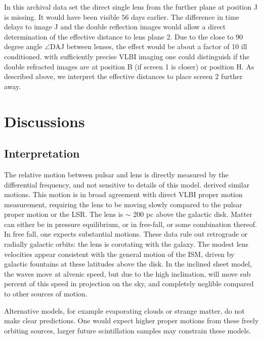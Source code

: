 \documentclass[useAMS,usenatbib]{mn2e}
\begin{document}

In this archival data set the direct single lens from the further
plane at position J is missing.  It would have been visible $56$ days
earlier. The difference in time delays to image J and the double
reflection images would allow a direct determination of the effective
distance to lens plane 2.  Due to the close to 90 degree angle $\angle$DAJ
between lenses, the effect would be about a factor of 10 ill
conditioned.  with sufficiently precise VLBI imaging one could
distinguish if the double refracted images are at position B (if
screen 1 is closer) or position H.  As described above, we interpret
the effective distances to place screen 2 further away.

\section{Discussions}

\subsection{Interpretation}

The relative motion between pulsar and lens is directly measured by
the differential frequency, and not sensitive to details of this
model.  \citet{2010ApJ...708..232B}  derived similar motions.  This
motion is in broad agreement with direct VLBI proper motion
measurement, requiring the lens to be moving slowly compared to the
pulsar proper motion or the LSR.  The lens is $\sim$ 200 pc above the
galactic disk.  Matter can either be in pressure equilibrium, or in
free-fall, or some combination thereof.  In free fall, one expects
substantial motions.  These data rule out retrograde or radially
galactic orbits: the lens is corotating with the galaxy.  The modest
lens velocities appear consistent with the general motion of the ISM,
driven by galactic fountains\citep{1976ApJ...205..762S} at these
latitudes above the disk.
In the inclined sheet model, the waves move at alvenic speed, but due
to the high inclination, will move sub percent of this speed in
projection on the sky, and completely neglible compared to other
sources of motion.

Alternative models, for example evaporating
clouds\citep{1998ApJ...498L.125W} or strange
matter\citep{2013PhLB..727..357P}, do not make clear predictions.  One
would expect higher proper motions from these freely orbiting sources,
larger future scintillation samples may constrain these models.
\end{document}
